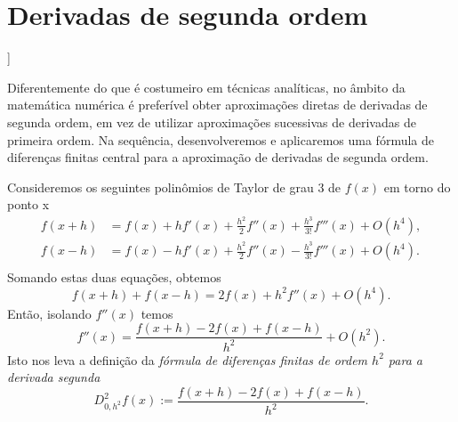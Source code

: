 \section{Derivadas de segunda ordem}\label{cap_deriv_sec_d2f}

\begin{flushleft}
  [[tag:revisar]]
\end{flushleft}

Diferentemente do que é costumeiro em técnicas analíticas, no âmbito da matemática numérica é preferível obter aproximações diretas de derivadas de segunda ordem, em vez de utilizar aproximações sucessivas de derivadas de primeira ordem. Na sequência, desenvolveremos e aplicaremos uma fórmula de diferenças finitas central para a aproximação de derivadas de segunda ordem.

Consideremos os seguintes polinômios de Taylor de grau 3 de $f(x)$ em torno do ponto x
\begin{align}
  f(x+h) &= f(x) + hf'(x) + \frac{h^2}{2}f''(x) + \frac{h^3}{3!}f'''(x) + O(h^4),\\
  f(x-h) &= f(x) - hf'(x) + \frac{h^2}{2}f''(x) - \frac{h^3}{3!}f'''(x) + O(h^4).\\
\end{align}
Somando estas duas equações, obtemos
\begin{equation}
  f(x+h)+f(x-h) = 2f(x) + h^2f''(x) + O(h^4).
\end{equation}
Então, isolando $f''(x)$ temos
\begin{equation}
  f''(x) = \frac{f(x+h) - 2f(x) + f(x-h)}{h^2} + O(h^2).
\end{equation}
Isto nos leva a definição da \emph{fórmula de diferenças finitas de ordem $h^2$ para a derivada segunda}
\begin{equation}
  D_{0,h^2}^2 f(x) := \frac{f(x+h) - 2f(x) + f(x-h)}{h^2}.
\end{equation}

